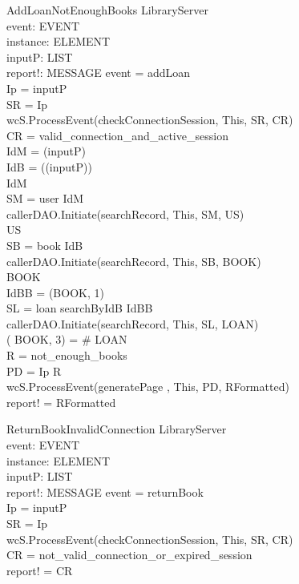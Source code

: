 \begin{schema}{AddLoanNotEnoughBooks}
\Delta LibraryServer \\
event: EVENT \\
instance: ELEMENT \\
inputP: LIST \\
report!: MESSAGE
\where event = addLoan \\
Ip = \head inputP \\
SR = \lseq Ip \rseq \\ 
wcS.ProcessEvent(checkConnectionSession, This, SR, CR) \\
CR = valid\_connection\_and\_active\_session \\
IdM = \head (\tail inputP) \\
IdB = \head (\tail (\tail inputP)) \\
IdM  \\
SM = \lseq user IdM \rseq \\
callerDAO.Initiate(searchRecord, This, SM, US) \\
US \neq \emptyset \\
SB = \lseq book IdB \rseq \\
callerDAO.Initiate(searchRecord, This, SB, BOOK) \\
BOOK \neq \emptyset \\
IdBB = \nth (\head BOOK, 1) \\
SL = \lseq loan searchByIdB IdBB \rseq \\
callerDAO.Initiate(searchRecord, This, SL, LOAN) \\
\nth( \head BOOK, 3) = \# LOAN \\
R = not\_enough\_books \\
PD = \lseq Ip R \rseq \\
wcS.ProcessEvent(generatePage , This, PD, RFormatted) \\
report! = RFormatted 
\end{schema}

\begin{schema}{ReturnBookInvalidConnection}
\Xi LibraryServer \\
event: EVENT \\
instance: ELEMENT \\
inputP: LIST \\
report!: MESSAGE
\where event = returnBook \\
Ip = \head inputP \\
SR = \lseq Ip \rseq \\ 
wcS.ProcessEvent(checkConnectionSession, This, SR, CR) \\
CR = not\_valid\_connection\_or\_expired\_session \\ 
report! = CR
\end{schema}

